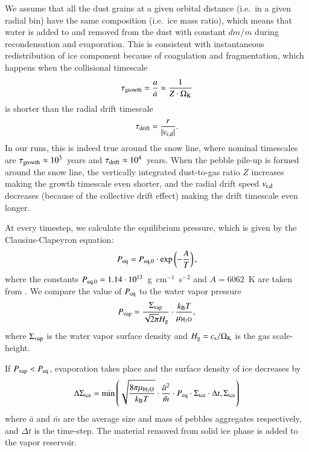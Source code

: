 \documentclass{aa}
\begin{document}
We assume that all the dust grains at a given orbital distance (i.e.~in a given radial bin) have the same composition (i.e.~ice mass ratio), which means that water is added to and removed from the dust with constant $dm/m$ during recondensation and evaporation. This is consistent with instantaneous redistribution of ice component because of coagulation and fragmentation, which happens when the collisional timescale
\begin{equation}\label{tgrowth}
\tau_{\rm growth} = \frac{a}{\dot{a}} \approx \frac{1}{Z\cdot\Omega_{\rm K}}
\end{equation}
\citep[see][]{2012A&A...539A.148B} is shorter than the radial drift timescale
\begin{equation}\label{tdrift}
\tau_{\rm drift} = \frac{r}{|v_{\rm r,d}|}.
\end{equation}
In our runs, this is indeed true around the snow line, where nominal timescales are $\tau_{\rm growth}\approx10^3$~years and $\tau_{\rm drift}\approx10^4$~years. When the pebble pile-up is formed around the snow line, the vertically integrated dust-to-gas ratio $Z$ increases making the growth timescale even shorter, and the radial drift speed $v_{\rm r,d}$ decreases (because of the collective drift effect) making the drift timescale even longer.

At every timestep, we calculate the equilibrium pressure, which is given by the Clausius-Clapeyron equation:
\begin{equation}
P_{\rm eq} = P_{{\rm eq},0}\cdot\exp\left({-\frac{A}{T}}\right),
\end{equation}
where the constants $P_{{\rm eq},0}=1.14\cdot10^{13}$~g~cm$^{-1}$~s$^{-2}$ and $A=6062$~K are taken from \citet{1991Icar...90..319L}. We compare the value of $P_{\rm eq}$ to the water vapor pressure
\begin{equation}
P_{\rm vap} = \frac{\Sigma_{\rm vap}}{\sqrt{2\pi}H_{\rm g}}\cdot\frac{k_{\rm B}T}{\mu_{\rm H_2O}},
\end{equation}
where $\Sigma_{\rm vap}$ is the water vapor surface density and $H_{\rm g} = c_{\rm s}/\Omega_{\rm K}$ is the gas scale-height. 

If $P_{\rm vap} < P_{\rm eq}$, evaporation takes place and the surface density of ice decreases by
\begin{equation}\label{evap}
\Delta{\Sigma}_{\rm ice} = \min\left(\sqrt{\frac{8\pi\mu_{\rm H_2O}}{k_{\rm B}T}}\cdot\frac{\bar{a}^2}{\bar{m}}\cdot P_{\rm eq}\cdot\Sigma_{\rm ice}\cdot\Delta{t},{\Sigma}_{\rm ice}\right)
\end{equation}
where $\bar{a}$ and $\bar{m}$ are the average size and mass of pebbles aggregates respectively, and $\Delta{t}$ is the time-step. The material removed from solid ice phase is added to the vapor reservoir. 
\end{document}
